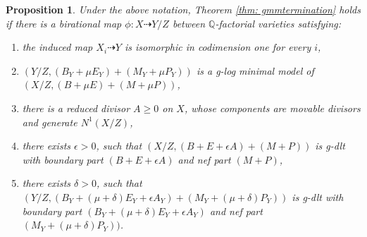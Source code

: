 \documentclass[11pt]{amsart}
\newcommand{\Qq}{\mathbb{Q}}
\newtheorem{proposition}[theorem]{Proposition}
\begin{document}
\begin{proposition}\label{prop: a special termination 1}
	Under the above notation, Theorem \ref{thm: gmmtermination} holds if there is a birational map $\phi:X\dashrightarrow Y/Z$ between $\Qq$-factorial varieties satisfying:
	\begin{enumerate}
		\item the induced map $X_i\dashrightarrow Y$ is isomorphic in codimension one for every $i$, 	
		\item $(Y/Z,(B_Y+\mu E_Y)+(M_Y+\mu P_Y))$ is a g-log minimal model of $(X/Z,(B+\mu E)+(M+\mu P))$,	
		\item there is a reduced divisor $A \geq 0$ on $X$, whose components are movable divisors and generate $N^1(X/Z)$,  	
		\item there exists $\epsilon>0$, such that $(X/Z,(B+E+\epsilon A)+(M+P))$ is g-dlt with boundary part $(B+E + \epsilon A)$ and nef part $(M+P)$,
		\item  there exists $\delta>0$, such that $(Y/Z, (B_Y+(\mu+\delta)E_Y + \epsilon A_Y) + (M_Y+(\mu+\delta)P_Y))$ is g-dlt with boundary part $(B_Y+(\mu+\delta) E_Y + \epsilon A_Y)$ and nef part $(M_Y+(\mu+\delta) P_Y))$.
	\end{enumerate}
\end{proposition}
\end{document}
